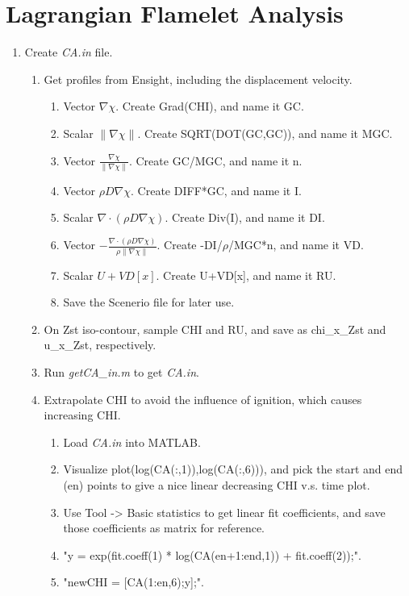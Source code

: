 \documentclass[11pt,english]{article}
\begin{document}
\section{Lagrangian Flamelet Analysis}
\begin{enumerate}
  \item Create \emph{CA.in} file.
  \begin{enumerate}
    \item Get profiles from Ensight, including the displacement velocity.
    \begin{enumerate}
      \item Vector $\nabla\chi$.  Create Grad(CHI), and name it GC.
      \item Scalar $\|\nabla\chi\|$.  Create SQRT(DOT(GC,GC)), and name it MGC.
      \item Vector $\frac{\nabla\chi}{\|\nabla\chi\|}$.  Create GC/MGC, and name it n.
      \item Vector $\rho D \nabla\chi$.  Create DIFF*GC, and name it I.
      \item Scalar $\nabla \cdot (\rho D \nabla\chi)$.  Create Div(I), and name it DI.
      \item Vector $-\frac{\nabla \cdot (\rho D \nabla\chi)}{\rho \|\nabla\chi\|}$.  Create -DI/$\rho$/MGC*n, and name it VD.
      \item Scalar $U + VD[x]$.  Create U+VD[x], and name it RU.
      \item Save the Scenerio file for later use.
    \end{enumerate}
    \item On Zst iso-contour, sample CHI and RU, and save as chi\_x\_Zst and u\_x\_Zst, respectively.
    \item Run \emph{getCA\_in.m} to get \emph{CA.in}.
    \item Extrapolate CHI to avoid the influence of ignition, which causes increasing CHI.
    \begin{enumerate}
      \item Load \emph{CA.in} into MATLAB.
      \item Visualize plot(log(CA(:,1)),log(CA(:,6))), and pick the start and end (en) points to give a nice linear decreasing CHI v.s. time plot.
      \item Use Tool -> Basic statistics to get linear fit coefficients, and save those coefficients as matrix for reference.
      \item "y = exp(fit.coeff(1) * log(CA(en+1:end,1)) + fit.coeff(2));".
      \item "newCHI = [CA(1:en,6);y];".

\end{enumerate}
\end{enumerate}
\end{enumerate}
\end{document}
